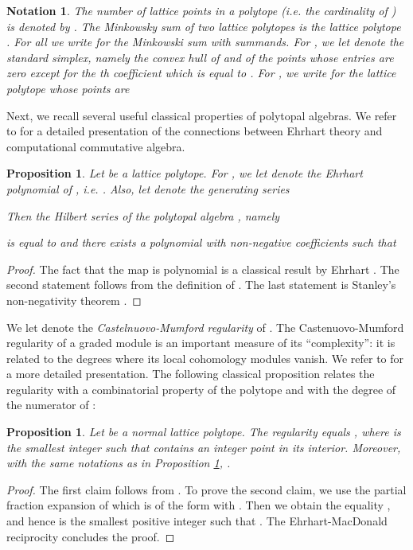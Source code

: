 \documentclass[12pt]{article}
\numberwithin{equation}{section}
\numberwithin{theorem}{section}
\newtheorem{proposition}[theorem]{Proposition}
\newtheorem{notation}[theorem]{Notation}
\begin{document}
\begin{notation}
The number of lattice points in a polytope 
(\emph{i.e.} the cardinality of ) is denoted by
.  The \emph{Minkowsky sum} of two lattice polytopes
 is the lattice polytope
. For all
 we write  for the Minkowski sum
 with  summands.  For , we
let  denote the \emph{standard simplex}, namely
the convex hull of  and of the points 
whose entries are zero except for the th coefficient which is equal
to .  For , we write
 for the lattice polytope
whose points are  
\end{notation}

Next, we recall several useful classical properties of polytopal algebras. We refer to \cite[Ch.~12]{MilStu05} for a detailed presentation of the connections between Ehrhart theory and computational commutative algebra.
\begin{proposition}\label{prop:HSpolytope}
Let  be a lattice polytope. For , we
let  denote the \emph{Ehrhart polynomial} of
, \emph{i.e.} . Also, let  denote the generating series

Then the Hilbert series of the polytopal algebra , namely

is equal to  and there exists a polynomial  with non-negative coefficients such that

\end{proposition}

\begin{proof}
The fact that the map  is polynomial is a classical result by Ehrhart \cite{ehrhart1962polyedres}. The second statement  follows from the definition of . The last statement is Stanley's non-negativity theorem \cite[Thm.~2.1]{stanley1980decompositions}.
\end{proof}

We let  denote the \emph{Castelnuovo-Mumford regularity} of . The Castenuovo-Mumford regularity of a graded module is an important measure of its ``complexity'': it is related to the degrees where its local cohomology modules vanish. We refer to \cite[Ch.~15]{brodmann2012local} for a more detailed presentation. The following classical proposition relates the regularity with a combinatorial property of the polytope  and with the degree of the numerator of :

\begin{proposition}\label{prop:regpolytope}
Let  be a normal lattice polytope.  The regularity
 equals , where  is the
smallest integer such that  contains an integer
point in its interior. Moreover, with the same notations as
in Proposition \ref{prop:HSpolytope}, .
\end{proposition}
\begin{proof}
The first claim follows from \cite[Sec.~5.4]{bruns1997normal}. To prove the second claim, we use the partial fraction expansion of  which is of the form  with . Then we obtain the equality , and hence  is the smallest positive integer such that .
The Ehrhart-MacDonald reciprocity \cite{Mac71} concludes the proof.
\end{proof}
\end{document}
